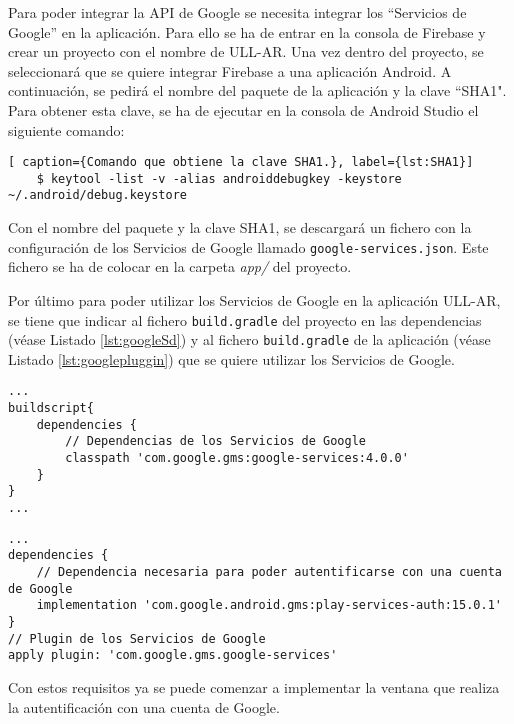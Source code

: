 Para poder integrar la API de Google se necesita integrar los ``Servicios de Google'' en la aplicación. Para ello se ha de entrar en la consola de Firebase \cite{URL::Firebase} y crear un proyecto con el nombre de ULL-AR. Una vez dentro del proyecto, se seleccionará que se quiere integrar Firebase a una aplicación Android. A continuación, se pedirá el nombre del paquete de la aplicación y la clave ``SHA1". Para obtener esta clave, se ha de ejecutar en la consola de Android Studio el siguiente comando: 
 
\begin{lstlisting}[ caption={Comando que obtiene la clave SHA1.}, label={lst:SHA1}]
    $ keytool -list -v -alias androiddebugkey -keystore ~/.android/debug.keystore
\end{lstlisting} 

Con el nombre del paquete y la clave SHA1, se descargará un fichero con la configuración de los Servicios de Google llamado \texttt{google-services.json}. Este fichero se ha de colocar en la carpeta \textit{app/} del proyecto.
 
Por último para poder utilizar los Servicios de Google en la aplicación ULL-AR, se tiene que indicar al fichero \texttt{build.gradle} del proyecto en las dependencias (véase Listado \ref{lst:googleSd}) y al fichero \texttt{build.gradle} de la aplicación (véase Listado \ref{lst:googlepluggin}) que se quiere utilizar  los Servicios de Google.

\begin{lstlisting}[caption={Fichero \texttt{build.gradle} del proyecto, dependencias para utilizar los Servicios de Google.}, label={lst:googleSd}]
...
buildscript{
    dependencies {
        // Dependencias de los Servicios de Google
        classpath 'com.google.gms:google-services:4.0.0'
    }    
} 
...
\end{lstlisting}
 
\begin{lstlisting}[caption={Fichero \texttt{build.gradle} de la aplicación, dependencias y plugin para utilizar los Servicios de Google.}, label={lst:googlepluggin}]
...
dependencies {
    // Dependencia necesaria para poder autentificarse con una cuenta de Google
    implementation 'com.google.android.gms:play-services-auth:15.0.1'
}
// Plugin de los Servicios de Google
apply plugin: 'com.google.gms.google-services'
\end{lstlisting}

Con estos requisitos ya se puede comenzar a implementar la ventana que realiza la autentificación con una cuenta de Google. 

